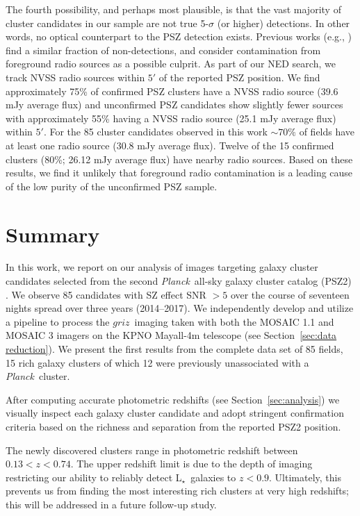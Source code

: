 \documentclass[apj, revtex4-1]{emulateapj}
\newcommand{\planck}{\textit{Planck}}
\newcommand{\sdssg}{\hbox{$g$}}
\newcommand{\sdssr}{\hbox{$r$}}
\newcommand{\sdssi}{\hbox{$i$}}
\newcommand{\sdssz}{\hbox{$z$}}
\newcommand{\lstar}{\hbox{L$_{\star}$}}
\newcommand{\eg}{e.g.}
\newcommand{\citeeg}[1]{(\eg, \citealt{#1})}
\begin{document}
The fourth possibility, and perhaps most plausible, is that the vast majority of cluster candidates in our sample are not true 5-$\sigma$ (or higher) detections.	In other words, no optical counterpart to the PSZ detection exists. Previous works \citeeg{Barrena2018} find a similar fraction of non-detections, and consider contamination from foreground radio sources as a possible culprit. As part of our NED search, we track NVSS radio sources within $5'$ of the reported PSZ position. We find approximately 75\% of confirmed PSZ clusters have a NVSS radio source (39.6 mJy average flux) and unconfirmed PSZ candidates show slightly fewer sources with approximately 55\% having a NVSS radio source (25.1 mJy average flux) within $5'$. For the 85 cluster candidates observed in this work $\sim70\%$ of fields have at least one radio source (30.8 mJy average flux). Twelve of the 15 confirmed clusters (80\%; 26.12 mJy average flux) have nearby radio sources. Based on these results, we find it unlikely that foreground radio contamination is a leading cause of the low purity of the unconfirmed PSZ sample.

\section{Summary}\label{sec:summary}
In this work, we report on our analysis of images targeting galaxy cluster candidates selected from the second \planck\ all-sky galaxy cluster catalog (PSZ2) \citep{PlanckCollaboration2015a}. We observe 85 candidates with SZ effect SNR $>5$ over the course of seventeen nights spread over three years (2014--2017). We independently develop and utilize a pipeline to process the \sdssg\sdssr\sdssi\sdssz\ imaging taken with both the MOSAIC 1.1 and MOSAIC 3 imagers on the KPNO Mayall-4m telescope (see Section~\ref{sec:data reduction}). We present the first results from the complete data set of 85 fields, 15 rich galaxy clusters of which 12 were previously unassociated with a \planck\ cluster.

After computing accurate photometric redshifts (see Section~\ref{sec:analysis}) we visually inspect each galaxy cluster candidate and adopt stringent confirmation criteria based on the richness and separation from the reported PSZ2 position.

The newly discovered clusters range in photometric redshift between $0.13 < z < 0.74$. The upper redshift limit is due to the depth of imaging restricting our ability to reliably detect \lstar\ galaxies to $z<0.9$. Ultimately, this prevents us from finding the most interesting rich clusters at very high redshifts; this will be addressed in a future follow-up study.
\end{document}
